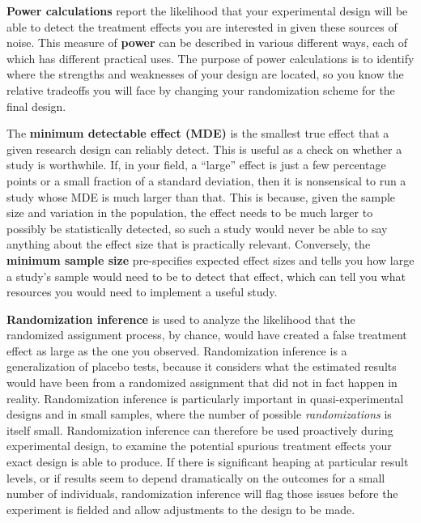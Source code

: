 \textbf{Power calculations} report the likelihood that your experimental design
will be able to detect the treatment effects you are interested in
given these sources of noise.
This measure of \textbf{power} can be described in various different ways,
each of which has different practical uses.
The purpose of power calculations is to identify where the strengths and weaknesses
of your design are located, so you know the relative tradeoffs you will face
by changing your randomization scheme for the final design.

The \textbf{minimum detectable effect (MDE)}
is the smallest true effect that a given research design can reliably detect.
This is useful as a check on whether a study is worthwhile.
If, in your field, a ``large'' effect is just a few percentage points
or a small fraction of a standard deviation,
then it is nonsensical to run a study whose MDE is much larger than that.
This is because, given the sample size and variation in the population,
the effect needs to be much larger to possibly be statistically detected,
so such a study would never be able to say anything about the effect size that is practically relevant.
Conversely, the \textbf{minimum sample size} pre-specifies expected effect sizes
and tells you how large a study's sample would need to be to detect that effect,
which can tell you what resources you would need
to implement a useful study.

\textbf{Randomization inference}
is used to analyze the likelihood
that the randomized assignment process, by chance,
would have created a false treatment effect as large as the one you observed.
Randomization inference is a generalization of placebo tests,
because it considers what the estimated results would have been
from a randomized assignment that did not in fact happen in reality.
Randomization inference is particularly important
in quasi-experimental designs and in small samples,
where the number of possible \textit{randomizations} is itself small.
Randomization inference can therefore be used proactively during experimental design,
to examine the potential spurious treatment effects your exact design is able to produce.
If there is significant heaping at particular result levels,
or if results seem to depend dramatically on the outcomes for a small number of individuals,
randomization inference will flag those issues before the experiment is fielded
and allow adjustments to the design to be made.
